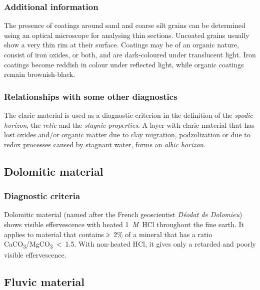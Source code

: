 \documentclass[
  letterpaper,
  DIV=11,
  numbers=noendperiod]{scrreprt}
\begin{document}
\hypertarget{additional-information-30}{%
\subsubsection{Additional information}\label{additional-information-30}}

The presence of coatings around sand and coarse silt grains can be
determined using an optical microscope for analysing thin sections.
Uncoated grains usually show a very thin rim at their surface. Coatings
may be of an organic nature, consist of iron oxides, or both, and are
dark-coloured under translucent light. Iron coatings become reddish in
colour under reflected light, while organic coatings remain
brownish-black.

\hypertarget{relationships-with-some-other-diagnostics-54}{%
\subsubsection{Relationships with some other
diagnostics}\label{relationships-with-some-other-diagnostics-54}}

The claric material is used as a diagnostic criterion in the definition
of the \emph{spodic horizon}, the \emph{retic} and the \emph{stagnic
properties}. A layer with claric material that has lost oxides and/or
organic matter due to clay migration, podzolization or due to redox
processes caused by stagnant water, forms an \emph{albic horizon}.

\hypertarget{dolomitic-material}{%
\subsection{Dolomitic material}\label{dolomitic-material}}

\hypertarget{diagnostic-criteria-61}{%
\subsubsection{Diagnostic criteria}\label{diagnostic-criteria-61}}

Dolomitic material (named after the French geoscientist \emph{Déodat de
Dolomieu}) shows visible effervescence with heated 1~\emph{M}~HCl
throughout the fine earth. It applies to material that contains ≥~2\% of
a mineral that has a ratio
CaCO\textsubscript{3}/MgCO\textsubscript{3}~\textless~1.5. With
non-heated HCl, it gives only a retarded and poorly visible
effervescence.

\hypertarget{fluvic-material}{%
\subsection{Fluvic material}\label{fluvic-material}}
\end{document}
